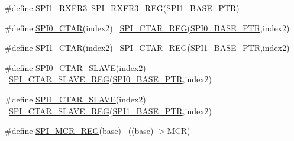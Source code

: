 \begin{DoxyCompactItemize}
\item 
\#define \hyperlink{group___s_p_i___register___accessor___macros_gaa7109ab9c0c71f5032aa3b387da1d0dc}{S\+P\+I1\+\_\+\+R\+X\+F\+R3}~\hyperlink{group___s_p_i___register___accessor___macros_ga2419cd7143d831f0a31ac7bda0da7af7}{S\+P\+I\+\_\+\+R\+X\+F\+R3\+\_\+\+R\+EG}(\hyperlink{group___s_p_i___peripheral_gae28fd789e0602a32076c1c13ca39f5af}{S\+P\+I1\+\_\+\+B\+A\+S\+E\+\_\+\+P\+TR})
\item 
\#define \hyperlink{group___s_p_i___register___accessor___macros_ga6284043913bd4cb314a1c3fa38930e30}{S\+P\+I0\+\_\+\+C\+T\+AR}(index2)                                            ~\hyperlink{group___s_p_i___register___accessor___macros_ga5ab762c9000b796d14c1ce822eefc436}{S\+P\+I\+\_\+\+C\+T\+A\+R\+\_\+\+R\+EG}(\hyperlink{group___s_p_i___peripheral_ga851f64a97b5919c1f99a34db5918b3b4}{S\+P\+I0\+\_\+\+B\+A\+S\+E\+\_\+\+P\+TR},index2)
\item 
\#define \hyperlink{group___s_p_i___register___accessor___macros_gacdd90c4720727e70d545f64fb6061adf}{S\+P\+I1\+\_\+\+C\+T\+AR}(index2)                                            ~\hyperlink{group___s_p_i___register___accessor___macros_ga5ab762c9000b796d14c1ce822eefc436}{S\+P\+I\+\_\+\+C\+T\+A\+R\+\_\+\+R\+EG}(\hyperlink{group___s_p_i___peripheral_gae28fd789e0602a32076c1c13ca39f5af}{S\+P\+I1\+\_\+\+B\+A\+S\+E\+\_\+\+P\+TR},index2)
\item 
\#define \hyperlink{group___s_p_i___register___accessor___macros_ga798105887218627609d0e8a5800f3ca9}{S\+P\+I0\+\_\+\+C\+T\+A\+R\+\_\+\+S\+L\+A\+VE}(index2)                                ~\hyperlink{group___s_p_i___register___accessor___macros_ga2025336cecfcf0c5b7cdb30e8056505b}{S\+P\+I\+\_\+\+C\+T\+A\+R\+\_\+\+S\+L\+A\+V\+E\+\_\+\+R\+EG}(\hyperlink{group___s_p_i___peripheral_ga851f64a97b5919c1f99a34db5918b3b4}{S\+P\+I0\+\_\+\+B\+A\+S\+E\+\_\+\+P\+TR},index2)
\item 
\#define \hyperlink{group___s_p_i___register___accessor___macros_ga94ba9eab472c3efa6152378d6c2c8275}{S\+P\+I1\+\_\+\+C\+T\+A\+R\+\_\+\+S\+L\+A\+VE}(index2)                                ~\hyperlink{group___s_p_i___register___accessor___macros_ga2025336cecfcf0c5b7cdb30e8056505b}{S\+P\+I\+\_\+\+C\+T\+A\+R\+\_\+\+S\+L\+A\+V\+E\+\_\+\+R\+EG}(\hyperlink{group___s_p_i___peripheral_gae28fd789e0602a32076c1c13ca39f5af}{S\+P\+I1\+\_\+\+B\+A\+S\+E\+\_\+\+P\+TR},index2)
\item 
\#define \hyperlink{group___s_p_i___register___accessor___macros_gae54fdee07e5ec098efe6da63f34f2ecd}{S\+P\+I\+\_\+\+M\+C\+R\+\_\+\+R\+EG}(base)                                            ~((base)-\/$>$M\+CR)

\end{DoxyCompactItemize}
